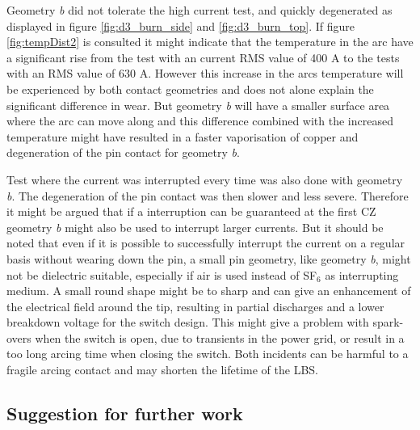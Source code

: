 \documentclass[10pt,a4paper,twoside]{article}
\begin{document}
Geometry \textit{b} did not tolerate the high current test, and quickly degenerated as displayed in figure \ref{fig:d3_burn_side} and \ref{fig:d3_burn_top}. If figure \ref{fig:tempDist2} is consulted it might indicate that the temperature in the arc have a significant rise from the test with an current RMS value of 400 A to the tests with an RMS value of 630 A. However this increase in the arcs temperature will be experienced by both contact geometries and does not alone explain the significant difference in wear. But geometry \textit{b} will have a smaller surface area where the arc can move along and this difference combined with the increased temperature might have resulted in a faster vaporisation of copper and degeneration of the pin contact for geometry \textit{b}.

Test where the current was interrupted every time was also done with geometry \textit{b}. The degeneration of the pin contact was then slower and less severe. Therefore it might be argued that if a interruption can be guaranteed at the first CZ geometry \textit{b} might also be used to interrupt larger currents. But it should be noted that even if it is possible to successfully interrupt the current on a regular basis without wearing down the pin, a small pin geometry, like geometry \textit{b}, might not be dielectric suitable, especially if air is used instead of SF$_6$ as interrupting medium. A small round shape might be to sharp and can give an enhancement of the electrical field around the tip, resulting in partial discharges and a lower breakdown voltage for the switch design. This might give a problem with spark-overs when the switch is open, due to transients in the power grid, or result in a too long arcing time when closing the switch. Both incidents can be harmful to a fragile arcing contact and may shorten the lifetime of the LBS.
\newpage
\subsection{Suggestion for further work}
\end{document}
